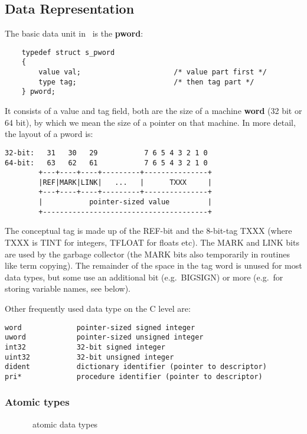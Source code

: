 \subsection{Data Representation}
\label{datarep}

The basic data unit in \eclipse\ is the {\bf pword}:
\begin{verbatim}
    typedef struct s_pword
    {
        value val;                      /* value part first */
        type tag;                       /* then tag part */
    } pword;
\end{verbatim}
It consists of a value and tag field, both are the size of a machine
{\bf word} (32 bit or 64 bit), by which we mean the size of
a pointer on that machine. In more detail, the layout of a pword is:
\begin{verbatim}
32-bit:   31   30   29           7 6 5 4 3 2 1 0
64-bit:   63   62   61           7 6 5 4 3 2 1 0
        +---+----+----+---------+---------------+
        |REF|MARK|LINK|   ...   |      TXXX     |
        +---+----+----+---------+---------------+
        |           pointer-sized value         |
        +---------------------------------------+
\end{verbatim}
The conceptual tag is made up of the REF-bit and the 8-bit-tag TXXX
(where TXXX is TINT for integers, TFLOAT for floats etc).
The MARK and LINK bits are used by the garbage collector (the MARK
bits also temporarily in routines like term copying).
The remainder of the space in the tag word is unused for most data
types, but some use an additional bit (e.g.\ BIGSIGN) or more (e.g.\
for storing variable names, see below).

Other frequently used data type on the C level are:
\begin{verbatim}
word             pointer-sized signed integer
uword            pointer-sized unsigned integer
int32            32-bit signed integer
uint32           32-bit unsigned integer
dident           dictionary identifier (pointer to descriptor)
pri*             procedure identifier (pointer to descriptor)
\end{verbatim}


\subsubsection{Atomic types}
\begin{figure}
\caption{\eclipse\ atomic data types}
\end{figure}

